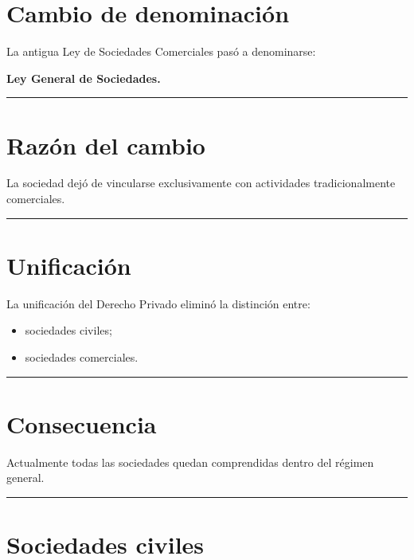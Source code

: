 \documentclass[
  spanish,
  letterpaper,
  DIV=11,
  numbers=noendperiod]{scrartcl}
\providecommand{\tightlist}{%
  \setlength{\itemsep}{0pt}\setlength{\parskip}{0pt}}
\begin{document}
\section{Cambio de denominación}\label{cambio-de-denominaciuxf3n}

La antigua Ley de Sociedades Comerciales pasó a denominarse:

\textbf{Ley General de Sociedades.}

\begin{center}\rule{0.5\linewidth}{0.5pt}\end{center}

\section{Razón del cambio}\label{razuxf3n-del-cambio}

La sociedad dejó de vincularse exclusivamente con actividades
tradicionalmente comerciales.

\begin{center}\rule{0.5\linewidth}{0.5pt}\end{center}

\section{Unificación}\label{unificaciuxf3n}

La unificación del Derecho Privado eliminó la distinción entre:

\begin{itemize}
\tightlist
\item
  sociedades civiles;
\item
  sociedades comerciales.
\end{itemize}

\begin{center}\rule{0.5\linewidth}{0.5pt}\end{center}

\section{Consecuencia}\label{consecuencia}

Actualmente todas las sociedades quedan comprendidas dentro del régimen
general.

\begin{center}\rule{0.5\linewidth}{0.5pt}\end{center}

\section{Sociedades civiles}\label{sociedades-civiles}
\end{document}
